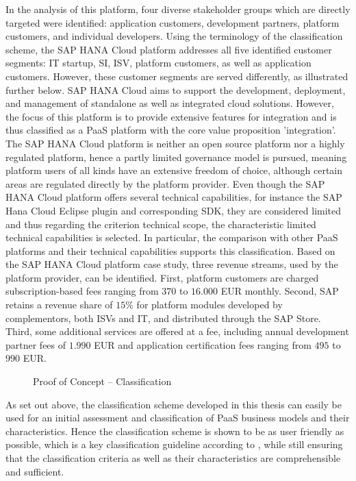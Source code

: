 In the analysis of this platform, four diverse stakeholder groups which are directly targeted were identified: application customers, development partners, platform customers, and individual developers. Using the terminology of the classification scheme, the SAP HANA Cloud platform addresses all five identified customer segments: \ac{IT} startup, \ac{SI}, \ac{ISV}, platform customers, as well as application customers. However, these customer segments are served differently, as illustrated further below. SAP HANA Cloud aims to support the development, deployment, and management of standalone as well as integrated cloud solutions. However, the focus of this platform is to provide extensive features for integration and is thus classified as a \ac{PaaS} platform with the core value proposition 'integration'. The SAP HANA Cloud platform is neither an open source platform nor a highly regulated platform, hence a partly limited governance model is pursued, meaning platform users of all kinds have an extensive freedom of choice, although certain areas are regulated directly by the platform provider. Even though the SAP HANA Cloud platform offers several technical capabilities, for instance the SAP Hana Cloud Eclipse plugin and corresponding \ac{SDK}, they are considered limited and thus regarding the criterion technical scope, the characteristic limited technical capabilities is selected. In particular, the comparison with other \ac{PaaS} platforms and their technical capabilities supports this classification. Based on the SAP HANA Cloud platform case study, three revenue streams, used by the platform provider, can be identified. First, platform customers are charged subscription-based fees ranging from $370$ to $16.000$ \ac{EUR} monthly. Second, SAP retains a revenue share of $15\%$ for platform modules developed by complementors, both \acp{ISV} and \ac{IT}, and distributed through the SAP Store. Third, some additional services are offered at a fee, including annual development partner fees of $1.990$ \ac{EUR} and application certification fees ranging from $495$ to $990$ \ac{EUR}.

\begin{figure}[tb]
	\centering
	
	\caption{Proof of Concept -- Classification}
	\label{fig:cs:sap}
\end{figure}

As set out above, the classification scheme developed in this thesis can easily be used for an initial assessment and classification of \ac{PaaS} business models and their characteristics. Hence the classification scheme is shown to be as user friendly as possible, which is a key classification guideline according to \citet[p. 41]{Fettke2003}, while still ensuring that the classification criteria as well as their characteristics are comprehensible and sufficient.


